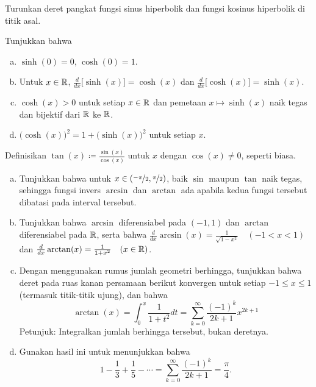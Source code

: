 \begin{exercise}
Turunkan deret pangkat fungsi sinus hiperbolik dan fungsi kosinus hiperbolik di titik asal.
\end{exercise}

\begin{exercise}
Tunjukkan bahwa
\begin{enumerate}[a)]
\item
$\sinh(0) = 0$, $\cosh(0) = 1$.
\item
Untuk $x \in {\mathbb{R}}$,
$\frac{d}{dx} \bigl[ \sinh(x) \bigr] = \cosh(x)$ dan
$\frac{d}{dx} \bigl[ \cosh(x) \bigr] = \sinh(x)$.
\item
$\cosh(x) > 0$ untuk setiap $x \in {\mathbb{R}}$ dan
pemetaan $x \mapsto \sinh(x)$ naik tegas dan bijektif dari ${\mathbb{R}}$ ke ${\mathbb{R}}$.
\item
${\bigl(\cosh(x)\bigr)}^2 = 1 + {\bigl(\sinh(x)\bigr)}^2$ untuk setiap
$x$.
\end{enumerate}
\end{exercise}

\begin{exercise}
Definisikan $\tan(x) \coloneqq \frac{\sin(x)}{\cos(x)}$ untuk $x$ dengan $\cos(x) \neq 0$, seperti biasa.
\begin{enumerate}[a)]
\item
Tunjukkan bahwa untuk $x \in (\nicefrac{-\pi}{2},\nicefrac{\pi}{2})$,
baik $\sin$ maupun $\tan$ naik tegas, sehingga
fungsi invers $\arcsin$
dan $\arctan$ ada apabila kedua fungsi tersebut dibatasi pada interval tersebut.
\item
Tunjukkan bahwa $\arcsin$ diferensiabel pada $(-1,1)$ dan $\arctan$
diferensiabel pada ${\mathbb{R}}$, serta bahwa
$\frac{d}{dx} \arcsin(x) = \frac{1}{\sqrt{1-x^2}} \quad (-1<x<1)$ dan
$\frac{d}{dx} \arctan(x) = \frac{1}{1+x^2} \quad (x \in {\mathbb{R}})$.
\item
Dengan menggunakan rumus jumlah geometri berhingga, tunjukkan bahwa deret pada
ruas kanan persamaan berikut konvergen untuk setiap $-1 \leq x \leq 1$
(termasuk titik-titik ujung), dan bahwa
\begin{equation*}
\arctan(x) = \int_0^x \frac{1}{1+t^2} dt
=
\sum_{k=0}^\infty \frac{{(-1)}^k}{2k+1} x^{2k+1}
\end{equation*}
Petunjuk: Integralkan jumlah berhingga tersebut, bukan deretnya.
\item
Gunakan hasil ini untuk menunjukkan bahwa
\begin{equation*}
1 - \frac{1}{3} + \frac{1}{5} - \cdots
=
\sum_{k=0}^\infty \frac{{(-1)}^k}{2k+1}
=
\frac{\pi}{4} .
\end{equation*}
\end{enumerate}
\end{exercise}

